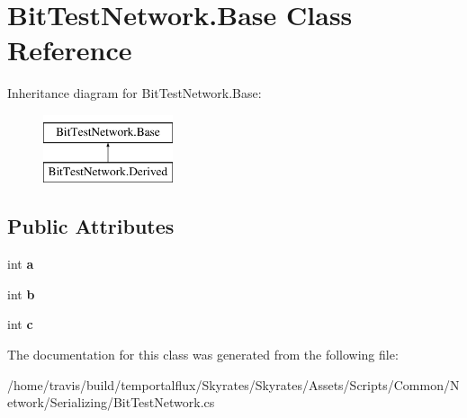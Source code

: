 \hypertarget{class_bit_test_network_1_1_base}{\section{Bit\-Test\-Network.\-Base Class Reference}
\label{class_bit_test_network_1_1_base}
}
Inheritance diagram for Bit\-Test\-Network.\-Base\-:\begin{figure}[H]
\begin{center}
\leavevmode
\includegraphics[height=2.000000cm]{class_bit_test_network_1_1_base}
\end{center}
\end{figure}
\subsection*{Public Attributes}
\begin{DoxyCompactItemize}
\item 
\hypertarget{class_bit_test_network_1_1_base_acfd49a304f09adbaea2e142c38a48713}{int {\bfseries a}}\label{class_bit_test_network_1_1_base_acfd49a304f09adbaea2e142c38a48713}

\item 
\hypertarget{class_bit_test_network_1_1_base_aff8d606dd882fb7dcebddf33d0048bb3}{int {\bfseries b}}\label{class_bit_test_network_1_1_base_aff8d606dd882fb7dcebddf33d0048bb3}

\item 
\hypertarget{class_bit_test_network_1_1_base_aee4cacebc6c7b08a68526da9fdc5b3fb}{int {\bfseries c}}\label{class_bit_test_network_1_1_base_aee4cacebc6c7b08a68526da9fdc5b3fb}

\end{DoxyCompactItemize}


The documentation for this class was generated from the following file\-:\begin{DoxyCompactItemize}
\item 
/home/travis/build/temportalflux/\-Skyrates/\-Skyrates/\-Assets/\-Scripts/\-Common/\-Network/\-Serializing/Bit\-Test\-Network.\-cs\end{DoxyCompactItemize}
